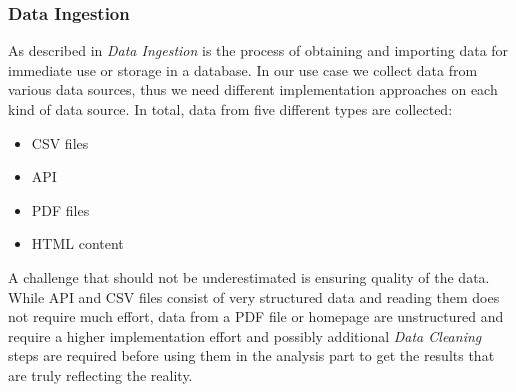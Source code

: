 \subsubsection{Data Ingestion}
\label{subsubsec:ingestion}
As described in \cite{ingestion} \textit{Data Ingestion} is the process of obtaining and importing data for immediate use or storage in a database. In our use case we collect data from various data sources, thus we need different implementation approaches on each kind of data source. \newline
In total, data from five different types are collected:
\begin{itemize}
  \item \ac{CSV} files
  \item \ac{API}
  \item \acs{PDF} files
  \item \acs{HTML} content
\end{itemize}
A challenge that should not be underestimated is ensuring quality of the data.
While \ac{API} and \ac{CSV} files consist of very structured data and reading them does not require much effort,
data from a \ac{PDF} file or homepage are unstructured and require a higher implementation effort and possibly additional
\textit{Data Cleaning} steps are required before using them in the analysis part to get the results that are truly reflecting the reality.
%
